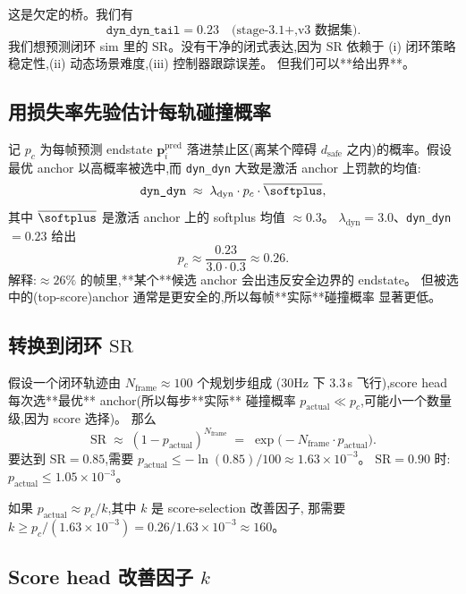 \documentclass[UTF8, 11pt]{ctexart}
\begin{document}
这是欠定的桥。我们有
\[
\texttt{dyn\_dyn\_tail} = 0.23 \quad \text{(stage-3.1+,v3 数据集)}.
\]
我们想预测闭环 sim 里的 $\text{SR}$。没有干净的闭式表达,因为 $\text{SR}$
依赖于 (i) 闭环策略稳定性,(ii) 动态场景难度,(iii) 控制器跟踪误差。
但我们可以**给出界**。

\subsection{用损失率先验估计每轨碰撞概率}

记 $p_c$ 为每帧预测 endstate $\bm{p}_i^{\text{pred}}$ 落进禁止区(离某个障碍
$d_{\text{safe}}$ 之内)的概率。假设最优 anchor 以高概率被选中,而
\texttt{dyn\_dyn} 大致是激活 anchor 上罚款的均值:
\begin{equation}\label{eq:pc-estimate}
\texttt{dyn\_dyn}
\;\approx\;
\lambda_{\text{dyn}} \cdot p_c \cdot \overline{\softplus} ,
\end{equation}
其中 $\overline{\softplus}$ 是激活 anchor 上的 softplus 均值 $\approx 0.3$。
$\lambda_{\text{dyn}} = 3.0$、\texttt{dyn\_dyn} $= 0.23$ 给出
\begin{equation}
p_c \approx \frac{0.23}{3.0 \cdot 0.3} \approx 0.26.
\end{equation}
解释:$\approx 26\%$ 的帧里,**某个**候选 anchor 会出违反安全边界的 endstate。
但被选中的(top-score)anchor 通常是更安全的,所以每帧**实际**碰撞概率
显著更低。

\subsection{转换到闭环 $\text{SR}$}

假设一个闭环轨迹由 $N_{\text{frame}} \approx 100$ 个规划步组成
(30Hz 下 3.3\,s 飞行),score head 每次选**最优** anchor(所以每步**实际**
碰撞概率 $p_{\text{actual}} \ll p_c$,可能小一个数量级,因为 score 选择)。
那么
\begin{equation}\label{eq:sr-bound}
\text{SR}
\;\approx\;
(1 - p_{\text{actual}})^{N_{\text{frame}}}
\;=\;
\exp\!\bigl(-N_{\text{frame}} \cdot p_{\text{actual}}\bigr).
\end{equation}
要达到 $\text{SR} = 0.85$,需要
$p_{\text{actual}} \le -\ln(0.85)/100 \approx 1.63 \times 10^{-3}$。
$\text{SR} = 0.90$ 时:$p_{\text{actual}} \le 1.05 \times 10^{-3}$。

如果 $p_{\text{actual}} \approx p_c/k$,其中 $k$ 是 score-selection 改善因子,
那需要 $k \ge p_c / (1.63\times 10^{-3}) = 0.26 / 1.63\times 10^{-3}
\approx 160$。

\subsection{Score head 改善因子 $k$}
\end{document}

